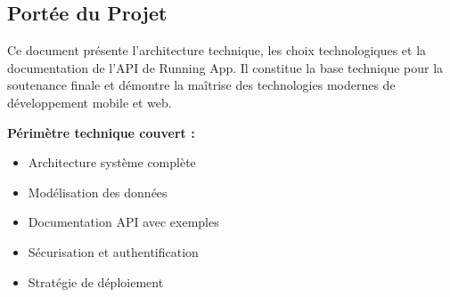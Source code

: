 \subsection{Portée du Projet}

Ce document présente l'architecture technique, les choix technologiques et la documentation de l'API de Running App. Il constitue la base technique pour la soutenance finale et démontre la maîtrise des technologies modernes de développement mobile et web.

\textbf{Périmètre technique couvert :}
\begin{itemize}
    \item Architecture système complète
    \item Modélisation des données
    \item Documentation API avec exemples
    \item Sécurisation et authentification
    \item Stratégie de déploiement
\end{itemize}